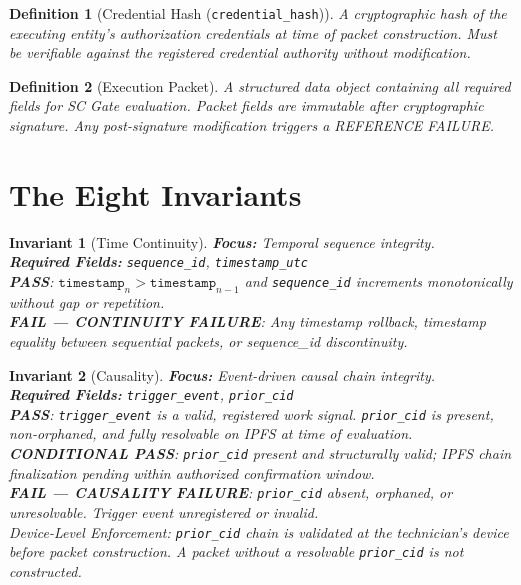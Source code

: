 \documentclass[11pt]{article}
\theoremstyle{invariantstyle}
\newtheorem{invariant}{Invariant}
\theoremstyle{defstyle}
\newtheorem{defn}{Definition}
\newcommand{\PASS}{\textcolor{passgreen}{\textbf{PASS}}}
\newcommand{\CPASS}{\textcolor{condyellow}{\textbf{CONDITIONAL PASS}}}
\newcommand{\FAIL}[1]{\textcolor{failred}{\textbf{FAIL — #1}}}
\begin{document}
\begin{defn}[Credential Hash (\texttt{credential\_hash})]
A cryptographic hash of the executing entity's authorization credentials
at time of packet construction. Must be verifiable against the registered
credential authority without modification.
\end{defn}

\begin{defn}[Execution Packet]
A structured data object containing all required fields for SC Gate
evaluation. Packet fields are immutable after cryptographic signature.
Any post-signature modification triggers a REFERENCE FAILURE.
\end{defn}

\section{The Eight Invariants}

\begin{invariant}[Time Continuity]
\textbf{Focus:} Temporal sequence integrity.\\
\textbf{Required Fields:} \texttt{sequence\_id}, \texttt{timestamp\_utc}\\[4pt]
\PASS: $\texttt{timestamp}_{n} > \texttt{timestamp}_{n-1}$ and
\texttt{sequence\_id} increments monotonically without gap or repetition.\\[2pt]
\FAIL{CONTINUITY FAILURE}: Any timestamp rollback, timestamp equality
between sequential packets, or sequence\_id discontinuity.
\end{invariant}

\begin{invariant}[Causality]
\textbf{Focus:} Event-driven causal chain integrity.\\
\textbf{Required Fields:} \texttt{trigger\_event}, \texttt{prior\_cid}\\[4pt]
\PASS: \texttt{trigger\_event} is a valid, registered work signal.
\texttt{prior\_cid} is present, non-orphaned, and fully resolvable
on IPFS at time of evaluation.\\[2pt]
\CPASS: \texttt{prior\_cid} present and structurally valid; IPFS
chain finalization pending within authorized confirmation window.\\[2pt]
\FAIL{CAUSALITY FAILURE}: \texttt{prior\_cid} absent, orphaned,
or unresolvable. Trigger event unregistered or invalid.\\[4pt]
\textit{Device-Level Enforcement:} \texttt{prior\_cid} chain is validated
at the technician's device before packet construction. A packet without
a resolvable \texttt{prior\_cid} is not constructed.
\end{invariant}
\end{document}
